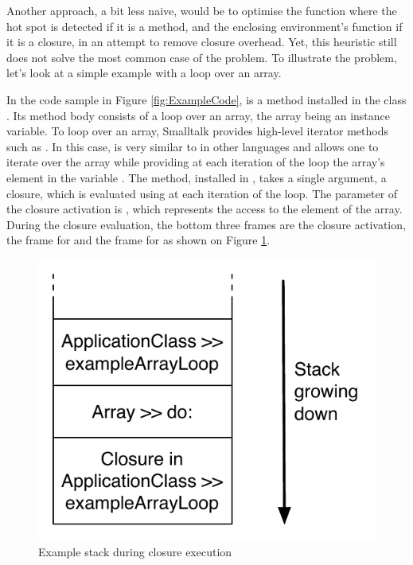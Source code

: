\documentclass[a4paper,12pt,twoside]{../includes/ThesisStyle}
\begin{document}
Another approach, a bit less naive, would be to optimise the function where the hot spot is detected if it is a method, and the enclosing environment's function if it is a closure, in an attempt to remove closure overhead. Yet, this heuristic still does not solve the most common case of the problem. To illustrate the problem, let's look at a simple example with a loop over an array.

In the code sample in Figure \ref{fig:ExampleCode},  is a method installed in the class . Its method body consists of a loop over an array, the array being an instance variable. To loop over an array, Smalltalk provides high-level iterator methods such as . In this case,  is very similar to  in other languages and allows one to iterate over the array while providing at each iteration of the loop the array's element in the variable . The  method, installed in , takes a single argument, a closure, which is evaluated using  at each iteration of the loop. The parameter of the closure activation is , which represents the access to the element  of the array. During the closure evaluation, the bottom three frames are the closure activation, the frame for  and the frame for  as shown on Figure \ref{fig:ExampleLoopStack}.

\begin{figure}[h!]
    \begin{center}
        \includegraphics[width=0.42\linewidth]{ExampleLoopStack}
        \caption{Example stack during closure execution}
        \label{fig:ExampleLoopStack}
    \end{center}
\end{figure}
\end{document}
